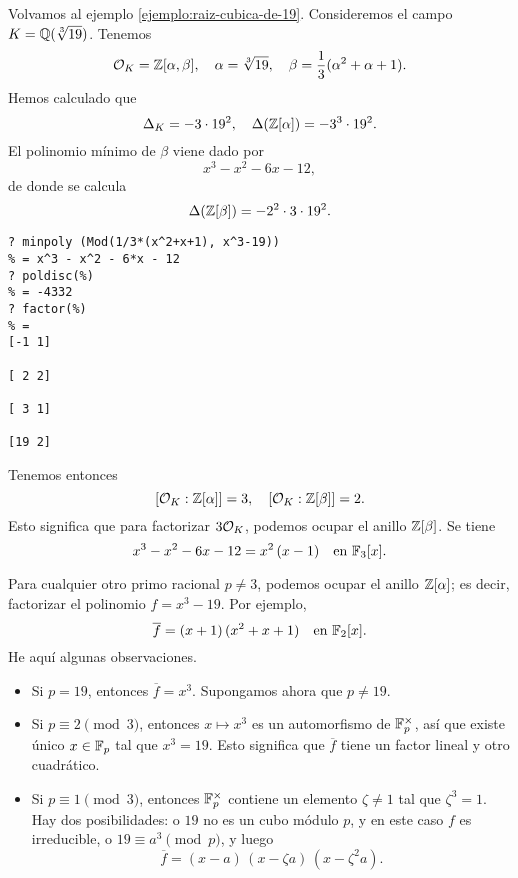 \begin{ejemplo}
  \label{ejemplo:raiz-cubica-de-19-factorizacion}
  Volvamos al ejemplo \ref{ejemplo:raiz-cubica-de-19}.
  Consideremos el campo $K = \mathbb{Q} (\sqrt[3]{19})$. Tenemos
  \[ \mathcal{O}_K = \mathbb{Z} [\alpha,\beta], \quad
     \alpha = \sqrt[3]{19}, \quad
     \beta = \frac{1}{3} (\alpha^2 + \alpha + 1). \]
  Hemos calculado que
  \[ \Delta_K = - 3\cdot 19^2, \quad
     \Delta (\mathbb{Z} [\alpha]) = - 3^3\cdot 19^2. \]
  El polinomio mínimo de $\beta$ viene dado por
  $$x^3 - x^2 - 6x - 12,$$
  de donde se calcula
  \[ \Delta (\mathbb{Z} [\beta]) = - 2^2 \cdot 3 \cdot 19^2. \]

  \begin{shaded}
\begin{verbatim}
? minpoly (Mod(1/3*(x^2+x+1), x^3-19))
% = x^3 - x^2 - 6*x - 12
? poldisc(%)
% = -4332
? factor(%)
% =
[-1 1]

[ 2 2]

[ 3 1]

[19 2]
\end{verbatim}
\end{shaded}

  Tenemos entonces
  $$[\mathcal{O}_K : \mathbb{Z} [\alpha]] = 3, \quad [\mathcal{O}_K : \mathbb{Z} [\beta]] = 2.$$
  Esto significa que para factorizar $3\mathcal{O}_K$, podemos ocupar el anillo
  $\mathbb{Z} [\beta]$. Se tiene
  $$x^3 - x^2 - 6x - 12 = x^2\,(x - 1) \quad\text{en }\mathbb{F}_3[x].$$

  Para cualquier otro primo racional $p \ne 3$, podemos ocupar el anillo
  $\mathbb{Z} [\alpha]$; es decir, factorizar el polinomio $f = x^3 - 19$.
  Por ejemplo,
  $$\overline{f} = (x+1)\,(x^2 + x + 1) \quad\text{en }\mathbb{F}_2[x].$$
  He aquí algunas observaciones.

  \begin{itemize}
  \item Si $p = 19$, entonces $\overline{f} = x^3$. Supongamos ahora que
    $p \ne 19$.

  \item Si $p \equiv 2 \pmod{3}$, entonces $x \mapsto x^3$ es un automorfismo de
    $\mathbb{F}_p^\times$, así que existe único $x \in \mathbb{F}_p$ tal que $x^3 = 19$. Esto
    significa que $\overline{f}$ tiene un factor lineal y otro cuadrático.

  \item Si $p \equiv 1 \pmod{3}$, entonces $\mathbb{F}_p^\times$ contiene un elemento
    $\zeta \ne 1$ tal que $\zeta^3 = 1$. Hay dos posibilidades: o $19$ no es un
    cubo módulo $p$, y en este caso $f$ es irreducible, o
    $19 \equiv a^3 \pmod{p}$, y luego
    $$\overline{f} = (x - a)\,(x - \zeta a)\,(x - \zeta^2 a).$$
  \end{itemize}


\end{ejemplo}
